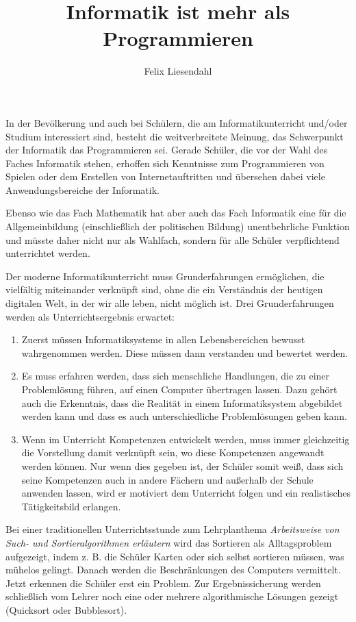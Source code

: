 \documentclass[12pt]{scrartcl}
\title{Informatik ist mehr als Programmieren}
\author{Felix Liesendahl}
\begin{document}
\maketitle
In der Bevölkerung und auch bei Schülern, die am Informatikunterricht und/oder Studium interessiert sind, besteht die weitverbreitete Meinung, das Schwerpunkt der Informatik das Programmieren sei.
Gerade Schüler, die vor der Wahl des Faches Informatik stehen, erhoffen sich Kenntnisse zum Programmieren von Spielen oder dem Erstellen von Internetauftritten und übersehen dabei viele Anwendungsbereiche der Informatik.

Ebenso wie das Fach Mathematik hat aber auch das Fach Informatik eine für die Allgemeinbildung (einschließlich der politischen Bildung) unentbehrliche Funktion und müsste daher nicht nur als Wahlfach, sondern für alle Schüler verpflichtend unterrichtet werden.

Der moderne Informatikunterricht muss Grunderfahrungen ermöglichen, die vielfältig miteinander verknüpft sind, ohne die ein Verständnis der heutigen digitalen Welt, in der wir alle leben, nicht möglich ist. Drei Grunderfahrungen werden als Unterrichtsergebnis erwartet:

\begin{enumerate}
 \item Zuerst müssen Informatiksysteme in allen Lebensbereichen bewusst wahrgenommen werden. Diese müssen dann verstanden und bewertet werden.
 \item Es muss erfahren werden, dass sich menschliche Handlungen, die zu einer Problemlösung führen, auf einen Computer übertragen lassen. Dazu gehört auch die Erkenntnis, dass die Realität in einem Informatiksystem abgebildet werden kann und dass es auch unterschiedliche Problemlösungen geben kann.
 \item Wenn im Unterricht Kompetenzen entwickelt werden, muss immer gleichzeitig die Vorstellung damit verknüpft sein, wo diese Kompetenzen angewandt werden können.
 Nur wenn dies gegeben ist, der Schüler somit weiß, dass sich seine Kompetenzen auch in andere Fächern und außerhalb der Schule anwenden lassen, wird er motiviert dem Unterricht folgen und ein realistisches Tätigkeitsbild erlangen.
\end{enumerate}

Bei einer traditionellen Unterrichtsstunde zum Lehrplanthema \textit{Arbeitsweise von Such- und Sortieralgorithmen erläutern} wird das Sortieren als Alltagsproblem aufgezeigt, indem z. B. die Schüler Karten oder sich selbst sortieren müssen, was mühelos gelingt. Danach werden die Beschränkungen des Computers vermittelt. Jetzt erkennen die Schüler erst ein Problem. Zur Ergebnissicherung werden schließlich vom Lehrer noch eine oder mehrere algorithmische Lösungen gezeigt (Quicksort oder Bubblesort).
\end{document}
